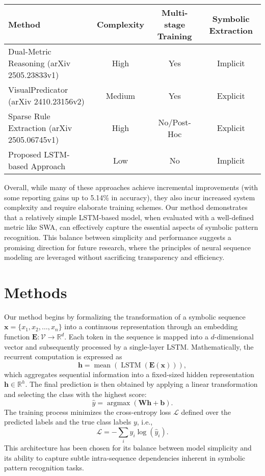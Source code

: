 \documentclass{article}
\begin{document}
\begin{table}[h]
\centering
\begin{tabular}{|l|c|c|c|}
\hline
\textbf{Method} & \textbf{Complexity} & \textbf{Multi-stage Training} & \textbf{Symbolic Extraction} \\ \hline
Dual-Metric Reasoning (arXiv 2505.23833v1) & High & Yes & Implicit \\ \hline
VisualPredicator (arXiv 2410.23156v2) & Medium & Yes & Explicit \\ \hline
Sparse Rule Extraction (arXiv 2505.06745v1) & High & No/Post-Hoc & Explicit \\ \hline
Proposed LSTM-based Approach & Low & No & Implicit \\ \hline
\end{tabular}
\label{tab:related}
\end{table}

Overall, while many of these approaches achieve incremental improvements (with some reporting gains up to 5.14\% in accuracy), they also incur increased system complexity and require elaborate training schemes. Our method demonstrates that a relatively simple LSTM-based model, when evaluated with a well-defined metric like SWA, can effectively capture the essential aspects of symbolic pattern recognition. This balance between simplicity and performance suggests a promising direction for future research, where the principles of neural sequence modeling are leveraged without sacrificing transparency and efficiency.

\section{Methods}
Our method begins by formalizing the transformation of a symbolic sequence \( \mathbf{x} = \{x_1, x_2, \dots, x_n\} \) into a continuous representation through an embedding function \( \mathbf{E}: \mathcal{V} \rightarrow \mathbb{R}^d \). Each token in the sequence is mapped into a \( d \)-dimensional vector and subsequently processed by a single-layer LSTM. Mathematically, the recurrent computation is expressed as 
\[
\mathbf{h} = \operatorname{mean}\left(\operatorname{LSTM}\left(\mathbf{E}(\mathbf{x})\right)\right),
\]
which aggregates sequential information into a fixed-sized hidden representation \( \mathbf{h} \in \mathbb{R}^{h} \). The final prediction is then obtained by applying a linear transformation and selecting the class with the highest score:
\[
\hat{y} = \operatorname{argmax}\left(\mathbf{W}\mathbf{h} + \mathbf{b}\right).
\]
The training process minimizes the cross-entropy loss \( \mathcal{L} \) defined over the predicted labels and the true class labels \( y \), i.e.,
\[
\mathcal{L} = -\sum_{i} y_i \log\left(\hat{y}_i\right).
\]
This architecture has been chosen for its balance between model simplicity and its ability to capture subtle intra-sequence dependencies inherent in symbolic pattern recognition tasks.
\end{document}
